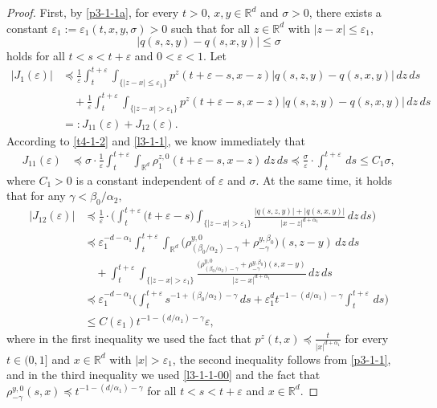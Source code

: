 \documentclass[a4paper,11pt]{amsart}
\renewcommand{\le}{\leqslant}
\newcommand{\R}{\mathds R}
\newcommand{\B}{\beta}
\newcommand{\p}{\preceq}
\newcommand{\A}{\alpha}
\newcommand{\G}{\gamma}
\newcommand{\e}{ \varepsilon}
\theoremstyle{definition}
\begin{document}
\begin{proof}
First, by \eqref{p3-1-1a}, for every $t>0$, $x,y \in \R^d$ and $\sigma>0$, there exists
a constant $\varepsilon_1:=\varepsilon_1(t,x,y, \sigma)>0$ such that for all $z\in \R^d$ with $|z-x|\le \varepsilon_1$,
\begin{equation}\label{t4-1-2}
|q(s,z,y)-q(s,x,y)|\le \sigma
\end{equation} holds for all $t<s<t+\e$ and $0<\e<1$.
Let
\begin{align*}
|J_1(\e)|&\p \frac{1}{\e}\int_t^{t+\e}\int_{\{|z-x|\le \varepsilon_1\}}p^z(t+\e-s,x-z)\big|
q(s,z,y)-q(s,x,y)\big|\,dz\,ds\\
&\quad +\frac{1}{\e}\int_t^{t+\e}\int_{\{|z-x|>\varepsilon_1\}}p^z(t+\e-s,x-z)\big|
q(s,z,y)-q(s,x,y)\big|\,dz\,ds\\
&=:J_{11}(\e)+J_{12}(\e).
\end{align*}
According to \eqref{t4-1-2} and \eqref{l3-1-1}, we know immediately that
\begin{align*}
J_{11}(\e)&\p \sigma\cdot\frac{1}{\e}\int_t^{t+\e}\int_{\R^d}\rho^{z,0}_{1}
(t+\e-s,x-z)\,dz\,ds\p \frac{\sigma}{\e}\cdot \int_t^{t+\e}\,ds \le C_1 \sigma,
\end{align*}
where $C_1>0$ is a constant independent of $\e$ and $\sigma$.
At the same time, it holds that for any $\G<{\B_0}/{\A_2},$
\begin{align*}
|J_{12}(\e)|&\p \frac{1}{\e}\cdot\bigg(
\int_t^{t+\e}\big(t+\e-s\big) \int_{\{|z-x|>\varepsilon_1\}}
\frac{|q(s,z,y)|+|q(s,x,y)|}{|x-z|^{d+\A_1}}\,dz\,ds\bigg)\\
&\p \varepsilon_1^{-d-\A_1}\int_t^{t+\e}
\int_{\R^d}\big(\rho^{y,0}_{({\B_0}/{\A_2})-\G}+\rho^{y,\B_0}_{-\G}\big)(s,z-y)\,dz\,ds\\
&\quad +\int_t^{t+\e}\int_{\{|z-x|>\varepsilon_1\}}
\frac{\big(\rho^{y,0}_{({\B_0}/{\A_2})-\G}+\rho^{y,\B_0}_{-\G}\big)(s,x-y)}{|z-x|^{d+\A_1}}\,dz\,ds\\
&\p \varepsilon_1^{-d-\A_1}\bigg(
\int_t^{t+\e}s^{-1+({\B_0}/{\A_2})-\G}\,ds+\varepsilon_1^d t^{-1-({d}/{\A_1})-\G} \int_t^{t+\e}\,ds\bigg)\\
&\le C(\varepsilon_1)t^{-1-({d}/{\A_1})-\G}\e,
\end{align*}
where in the first inequality we used the fact that $p^z(t,x)\p \frac{t}{|x|^{d+\A_1}}$ for every
$t \in (0,1]$ and $x\in \R^d$ with $|x|>\varepsilon_1$, the second inequality follows from \eqref{p3-1-1}, and in the third inequality we used \eqref{l3-1-1-00} and the fact
that $\rho^{y,0}_{-\G}(s,x)\p t^{-1-({d}/{\A_1})-\G}$ for all $t<s<t+\e$ and $x\in \R^d$.


\end{proof}
\end{document}
